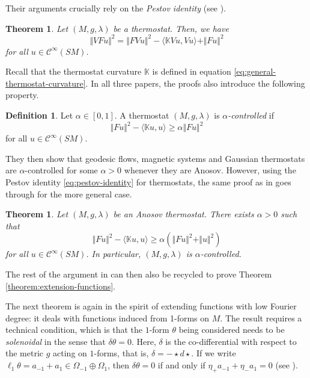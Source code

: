 \documentclass[reqno,12pt,letterpaper]{amsart}
\newtheorem{theorem}[proposition]{Theorem}
\theoremstyle{definition}
\newtheorem{definition}[proposition]{Definition}
\theoremstyle{remark}
\theoremstyle{definition}
\numberwithin{equation}{section}
\begin{document}
Their arguments crucially rely on the \textit{Pestov identity} (see \cite[Theorem 3.3]{dairbekov07}).

\begin{theorem}
Let $(M, g, \lambda)$ be a thermostat. Then, we have
\begin{equation}\label{eq:pestov-identity}
\Vert VF u\Vert^2=\Vert FVu\Vert^2-\langle \mathbb{K} Vu, Vu\rangle+\Vert Fu\Vert^2
\end{equation}
for all $u\in \mathcal{C}^\infty(SM)$.
\end{theorem}
Recall that the thermostat curvature $\mathbb{K}$ is defined in equation \eqref{eq:general-thermostat-curvature}. In all three papers, the proofs also introduce the following property.

\begin{definition}
Let $\alpha\in [0,1]$. A thermostat $(M, g, \lambda)$ is \textit{$\alpha$-controlled} if 
\begin{equation*}
\Vert F u\Vert^2-\langle\mathbb{K}u, u\rangle\geq \alpha\Vert F u \Vert^2
\end{equation*}
for all $u\in \mathcal{C}^\infty(SM)$.
\end{definition}

They then show that geodesic flows, magnetic systems and Gaussian thermostats are $\alpha$-controlled for some $\alpha>0$ whenever they are Anosov. However, using the Pestov identity \eqref{eq:pestov-identity} for thermostats, the same proof as in \cite[Theorem 3.1]{assylbekov17} goes through for the more general case. 

\begin{theorem}\label{theorem:alpha-regularity}
Let $(M, g, \lambda)$ be an Anosov thermostat. There exists $\alpha>0$ such that
\begin{equation*}
\Vert F u \Vert^2-\langle\mathbb{K} u, u\rangle\geq \alpha\left(\Vert Fu\Vert^2+\Vert u \Vert^2\right)
\end{equation*}
for all $u \in \mathcal{C}^\infty(SM)$. In particular, $(M, g,\lambda)$ is $\alpha$-controlled.  
\end{theorem}

The rest of the argument in \cite{assylbekov17} can then also be recycled to prove Theorem \ref{theorem:extension-functions}. 

The next theorem is again in the spirit of extending functions with low Fourier degree: it deals with functions induced from 1-forms on $M$. The result requires a technical condition, which is that the $1$-form $\theta$ being considered needs to be \textit{solenoidal} in the sense that $\delta \theta = 0$. Here, $\delta$ is the  co-differential with respect to the metric $g$ acting on $1$-forms, that is, $\delta = -\star d\star $. If we write $\ell_1\theta=a_{-1}+a_1\in \Omega_{-1}\oplus \Omega_1$, then $\delta \theta =0$ if and only if $\eta_+ a_{-1}+\eta_- a_1 = 0$ (see \cite{paternain14}).  
\end{document}
